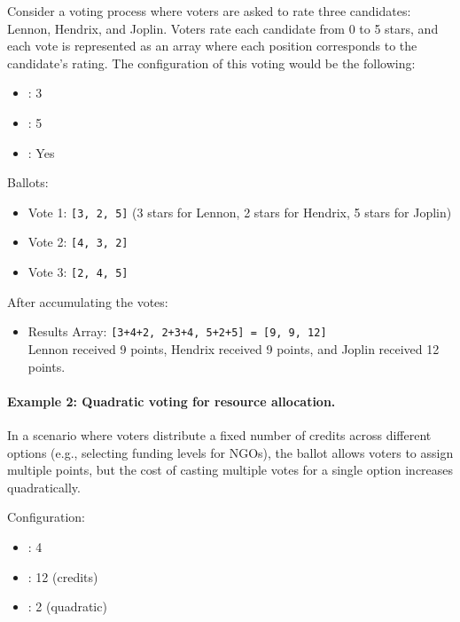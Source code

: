 Consider a voting process where voters are asked to rate three candidates: Lennon, Hendrix, and Joplin. Voters rate each candidate from 0 to 5 stars, and each vote is represented as an array where each position corresponds to the candidate’s rating. The configuration of this voting would be the following:

\begin{itemize}
	\item \maxcount: 3
	\item \maxvalue: 5
	\item \uniquevalues: Yes
\end{itemize}

Ballots:

\begin{itemize}
	\item Vote 1: \texttt{[3, 2, 5]} (3 stars for Lennon, 2 stars for Hendrix, 5 stars for Joplin)
	\item Vote 2: \texttt{[4, 3, 2]}
	\item Vote 3: \texttt{[2, 4, 5]}
\end{itemize}

After accumulating the votes:

\begin{itemize}
	\item Results Array: \texttt{[3+4+2, 2+3+4, 5+2+5] = [9, 9, 12]}\\
	Lennon received 9 points, Hendrix received 9 points, and Joplin received 12 points.
\end{itemize}

\paragraph{Example 2: Quadratic voting for resource allocation.} 

In a scenario where voters distribute a fixed number of credits across different options (e.g., selecting funding levels for NGOs), the ballot allows voters to assign multiple points, but the cost of casting multiple votes for a single option increases quadratically.

Configuration:

\begin{itemize}
	\item \maxcount: 4
	\item \maxtotalcost: 12 (credits)
	\item \costexponent: 2 (quadratic)
\end{itemize}

